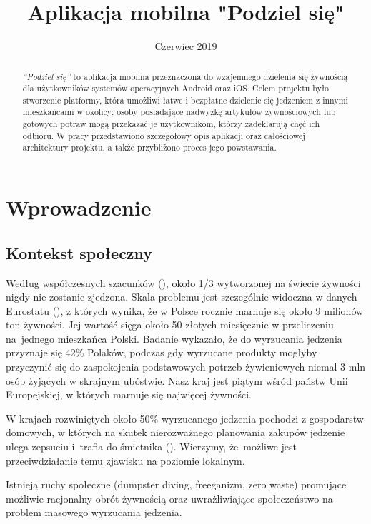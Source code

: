 \documentclass[licencjacka]{pracamgr}
\title{Aplikacja mobilna "Podziel się"}
\date{Czerwiec 2019}
\begin{document}
\maketitle

\begin{abstract}
\textit{``Podziel się''} to aplikacja mobilna przeznaczona do wzajemnego dzielenia się żywnością dla użytkowników systemów operacyjnych Android oraz iOS\@. Celem projektu było stworzenie platformy, która umożliwi łatwe i bezpłatne dzielenie się jedzeniem z innymi mieszkańcami w okolicy: osoby posiadające nadwyżkę artykułów żywnościowych lub gotowych potraw mogą przekazać je użytkownikom, którzy zadeklarują chęć ich odbioru. W pracy przedstawiono szczegółowy opis aplikacji oraz całościowej architektury projektu, a także przybliżono proces jego powstawania.
\end{abstract}

\tableofcontents

\chapter*{Wprowadzenie}
\section*{Kontekst społeczny}
Według współczesnych szacunków (\cite{fao}), około 1/3 wytworzonej na świecie żywności nigdy nie zostanie zjedzona. Skala problemu jest szczególnie widoczna w danych Eurostatu (\cite{eurostat}), z których wynika, że w Polsce rocznie marnuje się około 9 milionów ton żywności. Jej wartość sięga około 50 złotych miesięcznie w przeliczeniu na~jednego mieszkańca Polski. Badanie \cite{millward-brown} wykazało, że do wyrzucania jedzenia przyznaje się 42\% Polaków, podczas gdy wyrzucane produkty mogłyby przyczynić się do zaspokojenia podstawowych potrzeb żywieniowych niemal 3 mln osób żyjących w skrajnym ubóstwie. Nasz kraj jest piątym wśród państw Unii Europejskiej, w których marnuje się najwięcej żywności.

W krajach rozwiniętych około 50\% wyrzucanego jedzenia pochodzi z gospodarstw domowych, w których na skutek nierozważnego planowania zakupów jedzenie ulega zepsuciu i~trafia do śmietnika (\cite{polityka}). Wierzymy, że~możliwe jest przeciwdziałanie temu zjawisku na poziomie lokalnym.

Istnieją ruchy społeczne (dumpster diving, freeganizm, zero waste) promujące możliwie racjonalny obrót żywnością oraz uwrażliwiające społeczeństwo na problem masowego wyrzucania jedzenia.
\end{document}
